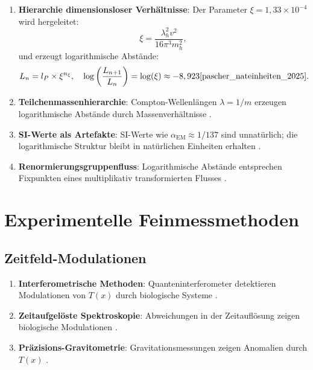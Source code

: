 \documentclass[12pt,a4paper]{article}
\newcommand{\Tfield}{T(x)}
\begin{document}
	\begin{enumerate}
		\item \textbf{Hierarchie dimensionsloser Verhältnisse}: Der Parameter $\xi = 1,33 \times 10^{-4}$ wird hergeleitet:
		\begin{equation}
			\xi = \frac{\lambda_h^2 v^2}{16 \pi^3 m_h^2},
		\end{equation}
		und erzeugt logarithmische Abstände:
		\begin{equation}
			L_n = l_P \times \xi^{n_\xi}, \quad \log\left(\frac{L_{n+1}}{L_n}\right) = \log(\xi) \approx -8,923 \cite{pascher_nateinheiten_2025}.
		\end{equation}
		\item \textbf{Teilchenmassenhierarchie}: Compton-Wellenlängen $\lambda = 1/m$ erzeugen logarithmische Abstände durch Massenverhältnisse \cite{pascher_nateinheiten_2025}.
		\item \textbf{SI-Werte als Artefakte}: SI-Werte wie $\alpha_{\text{EM}} \approx 1/137$ sind unnatürlich; die logarithmische Struktur bleibt in natürlichen Einheiten erhalten \cite{pascher_nateinheiten_2025}.
		\item \textbf{Renormierungsgruppenfluss}: Logarithmische Abstände entsprechen Fixpunkten eines multiplikativ transformierten Flusses \cite{pascher_nateinheiten_2025}.
	\end{enumerate}
	
	\section{Experimentelle Feinmessmethoden}
	
	\subsection{Zeitfeld-Modulationen}
	
	\begin{enumerate}
		\item \textbf{Interferometrische Methoden}: Quanteninterferometer detektieren Modulationen von $\Tfield$ durch biologische Systeme \cite{pascher_nateinheiten_2025}.
		\item \textbf{Zeitaufgelöste Spektroskopie}: Abweichungen in der Zeitauflösung zeigen biologische Modulationen \cite{pascher_nateinheiten_2025}.
		\item \textbf{Präzisions-Gravitometrie}: Gravitationsmessungen zeigen Anomalien durch $\Tfield$ \cite{pascher_nateinheiten_2025}.
	\end{enumerate}
	
\end{document}
